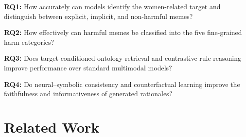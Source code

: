 \documentclass[11pt]{article}
\begin{document}
\noindent\textbf{RQ1:} How accurately can models identify the
women-related target and distinguish between explicit, implicit, and
non-harmful memes?

\noindent\textbf{RQ2:} How effectively can harmful memes be
classified into the five fine-grained harm categories?

\noindent\textbf{RQ3:} Does target-conditioned ontology retrieval and
contrastive rule reasoning improve performance over standard
multimodal models?

\noindent\textbf{RQ4:} Do neural--symbolic consistency and
counterfactual learning improve the faithfulness and informativeness
of generated rationales?






\section{Related Work}
\label{sec:related-work}
\end{document}
